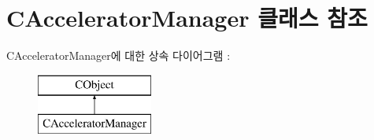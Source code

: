 \hypertarget{class_c_accelerator_manager}{}\section{C\+Accelerator\+Manager 클래스 참조}
\label{class_c_accelerator_manager}
C\+Accelerator\+Manager에 대한 상속 다이어그램 \+: \begin{figure}[H]
\begin{center}
\leavevmode
\includegraphics[height=2.000000cm]{class_c_accelerator_manager}
\end{center}
\end{figure}
